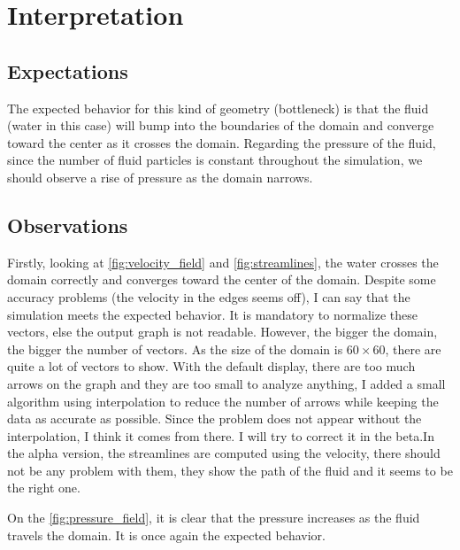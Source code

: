 \section{Interpretation}
\subsection{Expectations}
The expected behavior for this kind of geometry (bottleneck) is that the fluid
(water in this case) will bump into the boundaries of the domain and converge
toward the center as it crosses the domain. Regarding the pressure of the
fluid, since the number of fluid particles is constant throughout the
simulation, we should observe a rise of pressure as the domain narrows.

\subsection{Observations}
Firstly, looking at \autoref{fig:velocity_field} and \autoref{fig:streamlines},
the water crosses the domain correctly and converges toward the center of the
domain. Despite some accuracy problems (the velocity in the edges seems off),
I can say that the simulation meets the expected behavior. It is mandatory to
normalize these vectors, else the output graph is not readable. However, the
bigger the domain, the bigger the number of vectors. As the size of the domain 
is $\num{60} \times \num{60}$, there are quite a lot of vectors to show. With
the default display, there are too much arrows on the graph and they are too
small to analyze anything, I added a small algorithm using interpolation to
reduce the number of arrows while keeping the data as accurate as possible.
Since the problem does not appear without the interpolation, I think it comes
from there. I will try to correct it in the beta.In the alpha version, the
streamlines are computed using the velocity, there should not be any problem
with them, they show the path of the fluid and it seems to be the right one.

\smallbreak{}
On the \autoref{fig:pressure_field}, it is clear that the pressure increases as
the fluid travels the domain. It is once again the expected behavior.


\newpage
\begin{multicols}{2}
    [\center{\printbibheading}]
    \printbibliography[heading=none]
\end{multicols}
